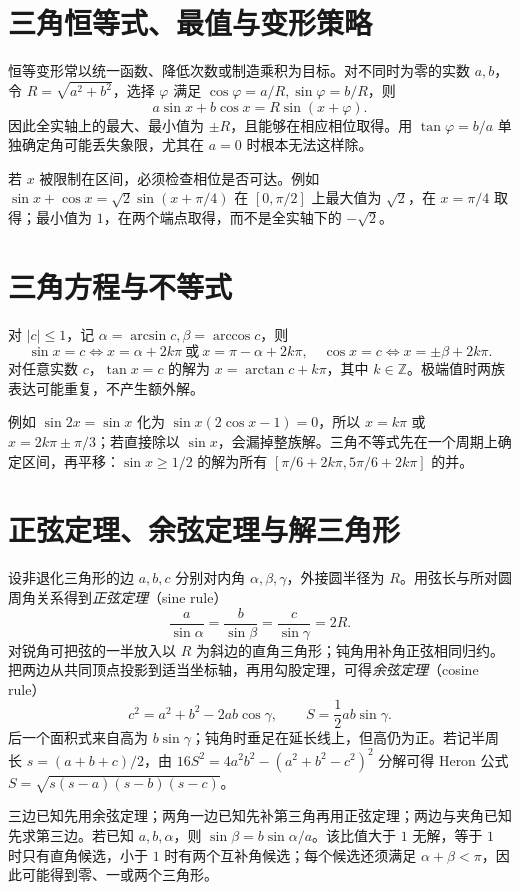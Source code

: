 \section{三角恒等式、最值与变形策略}
恒等变形常以统一函数、降低次数或制造乘积为目标。对不同时为零的实数 $a,b$，令 $R=\sqrt{a^2+b^2}$，选择 $\varphi$ 满足 $\cos\varphi=a/R,\sin\varphi=b/R$，则
\[
 a\sin x+b\cos x=R\sin(x+\varphi).
\]
因此全实轴上的最大、最小值为 $\pm R$，且能够在相应相位取得。用 $\tan\varphi=b/a$ 单独确定角可能丢失象限，尤其在 $a=0$ 时根本无法这样除。

若 $x$ 被限制在区间，必须检查相位是否可达。例如 $\sin x+\cos x=\sqrt2\sin(x+\pi/4)$ 在 $[0,\pi/2]$ 上最大值为 $\sqrt2$，在 $x=\pi/4$ 取得；最小值为 $1$，在两个端点取得，而不是全实轴下的 $-\sqrt2$。

\section{三角方程与不等式}
对 $|c|\le1$，记 $\alpha=\arcsin c,\beta=\arccos c$，则
\[
 \sin x=c\Longleftrightarrow x=\alpha+2k\pi\ \text{或}\ x=\pi-\alpha+2k\pi,
 \quad
 \cos x=c\Longleftrightarrow x=\pm\beta+2k\pi.
\]
对任意实数 $c$，$\tan x=c$ 的解为 $x=\arctan c+k\pi$，其中 $k\in\mathbb Z$。极端值时两族表达可能重复，不产生额外解。

例如 $\sin2x=\sin x$ 化为 $\sin x(2\cos x-1)=0$，所以 $x=k\pi$ 或 $x=2k\pi\pm\pi/3$；若直接除以 $\sin x$，会漏掉整族解。三角不等式先在一个周期上确定区间，再平移：$\sin x\ge1/2$ 的解为所有 $[\pi/6+2k\pi,5\pi/6+2k\pi]$ 的并。

\section{正弦定理、余弦定理与解三角形}
设非退化三角形的边 $a,b,c$ 分别对内角 $\alpha,\beta,\gamma$，外接圆半径为 $R$。用弦长与所对圆周角关系得到\emph{正弦定理}（sine rule）
\[
 \frac a{\sin\alpha}=\frac b{\sin\beta}=\frac c{\sin\gamma}=2R.
\]
对锐角可把弦的一半放入以 $R$ 为斜边的直角三角形；钝角用补角正弦相同归约。把两边从共同顶点投影到适当坐标轴，再用勾股定理，可得\emph{余弦定理}（cosine rule）
\begin{equation}\label{eq:em-cosine-rule}
 c^2=a^2+b^2-2ab\cos\gamma,\qquad
 S=\frac12ab\sin\gamma.
\end{equation}
后一个面积式来自高为 $b\sin\gamma$；钝角时垂足在延长线上，但高仍为正。若记半周长 $s=(a+b+c)/2$，由 $16S^2=4a^2b^2-(a^2+b^2-c^2)^2$ 分解可得 Heron 公式 $S=\sqrt{s(s-a)(s-b)(s-c)}$。

三边已知先用余弦定理；两角一边已知先补第三角再用正弦定理；两边与夹角已知先求第三边。若已知 $a,b,\alpha$，则 $\sin\beta=b\sin\alpha/a$。该比值大于 $1$ 无解，等于 $1$ 时只有直角候选，小于 $1$ 时有两个互补角候选；每个候选还须满足 $\alpha+\beta<\pi$，因此可能得到零、一或两个三角形。

